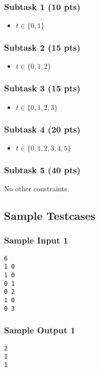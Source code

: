 \subsubsection{Subtask 1 (10 pts)}\label{subtask-1}
\begin{itemize}
\item $t\in \{0, 1\}$
\end{itemize}

\subsubsection{Subtask 2 (15 pts)}\label{subtask-2}
\begin{itemize}
\item $t\in \{0, 1, 2\}$
\end{itemize}

\subsubsection{Subtask 3 (15 pts)}\label{subtask-3}
\begin{itemize}
\item $t\in \{0, 1, 2, 3\}$
\end{itemize}

\subsubsection{Subtask 4 (20 pts)}\label{subtask-4}
\begin{itemize}
\item $t\in \{0, 1, 2, 3, 4, 5\}$
\end{itemize}

\subsubsection{Subtask 5 (40 pts)}\label{subtask-5}

No other constraints.

\subsection{Sample Testcases}\label{sample-testcases}

\begin{multicols}{2}
\subsubsection{Sample Input 1}\label{sample-input-1}
\begin{verbatim}
6
1 0
1 0
0 1
0 2
1 0
0 3
\end{verbatim}

\columnbreak

\subsubsection{Sample Output 1}\label{sample-output-1}
\begin{verbatim}
2
1
1
\end{verbatim}
\end{multicols}


